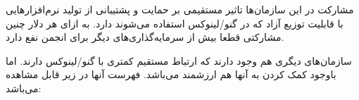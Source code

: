 مشارکت در این سازمان‌ها تاثیر مستقیمی بر حمایت و پشتیبانی از تولید
نرم‌افزارهایی با قابلیت توزیع آزاد که در گنو/لینوکس استفاده می‌شوند دارد.
به ازای هر دلار چنین مشارکتی قطعا بیش از سرمایه‌گذاری‌های دیگر برای انجمن نفع دارد.

سازمان‌های دیگری هم وجود دارند که ارتباط مستقیم کمتری با گنو/لینوکس دارند.
اما باوجود کمک کردن به آنها هم ارزشمند می‌باشد. فهرست آنها در زیر قابل مشاهده می‌باشد:

